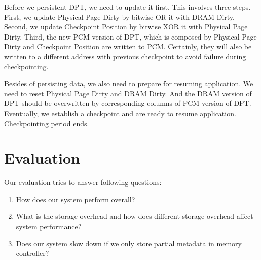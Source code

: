\documentclass[conference]{IEEEtran}
\begin{document}
Before we persistent DPT, we need to update it first.
This involves three steps.
First, we update Physical Page Dirty by bitwise OR it with DRAM Dirty.
Second, we update Checkpoint Position by bitwise XOR it with Physical Page Dirty.
Third, the new PCM version of DPT, which is composed by Physical Page Dirty and Checkpoint Position are written to PCM\@.
Certainly, they will also be written to a different address with previous checkpoint to avoid failure during checkpointing.

Besides of persisting data, we also need to prepare for resuming application.
We need to reset Physical Page Dirty and DRAM Dirty.
And the DRAM version of DPT should be overwritten by corresponding columns of PCM version of DPT\@.
Eventually, we establish a checkpoint and are ready to resume application.
Checkpointing period ends.


%
%

\section{Evaluation}\label{sec:evaluation}

Our evaluation tries to answer following questions:
\begin{enumerate}
    \item How does our system perform overall?
    \item What is the storage overhead and how does different storage overhead affect system performance?
    \item Does our system slow down if we only store partial metadata in memory controller?
\end{enumerate}
\end{document}
